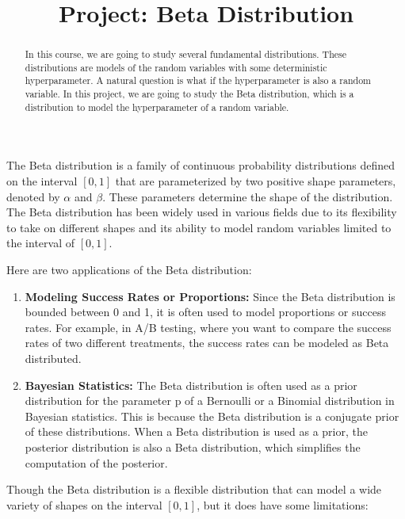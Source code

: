 \documentclass{article}
\title{Project: Beta Distribution}
\author{}
\date{}
\begin{document}
\maketitle
\begin{abstract}
    In this course, we are going to study several fundamental distributions. These distributions are models of the random variables with some deterministic hyperparameter. A natural question is what if the hyperparameter is also a random variable. In this project, we are going to study the Beta distribution, which is a distribution to model the hyperparameter of a random variable.
\end{abstract}

The Beta distribution is a family of continuous probability distributions defined on the interval $[0, 1]$ that are parameterized by two positive shape parameters, denoted by $\alpha$ and $\beta$. These parameters determine the shape of the distribution. The Beta distribution has been widely used in various fields due to its flexibility to take on different shapes and its ability to model random variables limited to the interval of $[0,1]$.

Here are two applications of the Beta distribution:
\begin{enumerate}
    \item \textbf{Modeling Success Rates or Proportions:} Since the Beta distribution is bounded between 0 and 1, it is often used to model proportions or success rates. For example, in A/B testing, where you want to compare the success rates of two different treatments, the success rates can be modeled as Beta distributed.
    \item \textbf{Bayesian Statistics:} The Beta distribution is often used as a prior distribution for the parameter p of a Bernoulli or a Binomial distribution in Bayesian statistics. This is because the Beta distribution is a conjugate prior of these distributions. When a Beta distribution is used as a prior, the posterior distribution is also a Beta distribution, which simplifies the computation of the posterior.
\end{enumerate}

Though the Beta distribution is a flexible distribution that can model a wide variety of shapes on the interval $[0, 1]$, but it does have some limitations:
\end{document}

